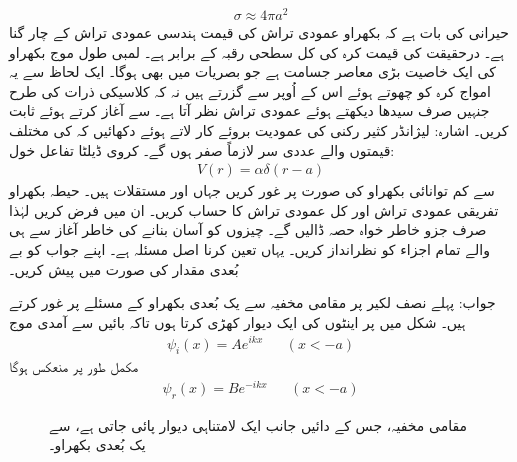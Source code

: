 \begin{align}
	\sigma\approx4\pi a^2
\end{align}
حیرانی کی بات ہے کہ بکھراو عمودی تراش کی قیمت ہندسی عمودی تراش کے چار گنا ہے۔ درحقیقت  کی قیمت کرہ کی کل سطحی رقبہ کے برابر ہے۔ لمبی طول موج بکھراو کی ایک خاصیت بڑی معاصر جسامت ہے جو بصریات میں بھی ہوگا۔ ایک لحاظ سے یہ امواج کرہ کو چھوتے ہوئے اس کے اُوپر سے گزرتے ہیں نہ کہ کلاسیکی ذرات کی طرح جنہیں صرف سیدھا دیکھتے ہوئے عمودی تراش نظر آتا ہے۔
 سے آغاز کرتے ہوئے  ثابت کریں۔ اشارہ: لیژانڈر کثیر رکنی کی عمودیت بروئے کار لاتے ہوئے دکھائیں کہ  کی مختلف قیمتوں والے عددی سر لازماً صفر ہوں گے۔
کروی ڈیلٹا تفاعل خول:
\begin{align*}
	V(r) = \alpha\delta(r-a)
\end{align*}
سے کم توانائی بکھراو کی صورت  پر غور کریں جہاں  اور  مستقلات ہیں۔ حیطہ بکھراو  تفریقی عمودی تراش  اور کل عمودی تراش  کا حساب کریں۔ ان میں  فرض کریں لہٰذا صرف  جزو  خاطر خواہ حصہ ڈالیں گے۔ چیزوں کو آسان بنانے کی خاطر آغاز سے ہی  والے تمام اجزاء کو نظرانداز کریں۔ یہاں  تعین کرنا اصل مسئلہ ہے۔ اپنے جواب کو بے بُعدی مقدار  کی صورت میں پیش کریں۔

جواب: 	
پہلے نصف لکیر  پر مقامی مخفیہ  سے یک بُعدی بکھراو کے مسئلے پر غور کرتے ہیں۔ شکل   میں  پر اینٹوں  کی ایک دیوار کھڑی کرتا ہوں تاکہ بائیں سے آمدی موج 
\begin{align}
	\psi_i(x) = Ae^{ikx}&&(x<-a)
\end{align}
مکمل طور پر منعکس ہوگا
\begin{align}
	\psi_r(x) = Be^{-ikx}&&(x<-a)
\end{align}
%
\begin{figure}
\centering
{}
\caption{مقامی مخفیہ، جس کے  دائیں جانب ایک   لامتناہی دیوار  پائی جاتی ہے، سے یک بُعدی بکھراو۔}
\label{شکل_بکھراو_یک_بعدی_مقامی_مخفیہ}
\end{figure}

